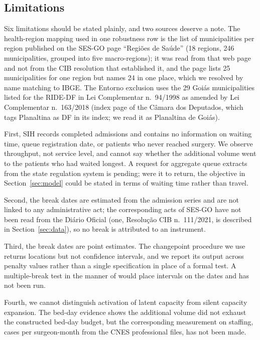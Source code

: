 \subsection{Limitations}
\label{sec:limits}

Six limitations should be stated plainly, and two sources deserve a note. The health-region mapping used in one robustness row is the list of municipalities per region published on the SES-GO page ``Regi\~oes de Sa\'ude'' (18 regions, 246 municipalities, grouped into five macro-regions); it was read from that web page and not from the CIB resolution that established it, and the page lists 25 municipalities for one region but names 24 in one place, which we resolved by name matching to IBGE. The Entorno exclusion uses the 29 Goi\'as municipalities listed for the RIDE-DF in Lei Complementar n.\ 94/1998 as amended by Lei Complementar n.\ 163/2018 (index page of the C\^amara dos Deputados, which tags Planaltina as DF in its index; we read it as Planaltina de Goi\'as).

First, SIH records completed admissions and contains no information on waiting
time, queue registration date, or patients who never reached surgery. We observe
throughput, not service level, and cannot say whether the additional volume went
to the patients who had waited longest. A request for aggregate queue extracts
from the state regulation system is pending; were it to return, the objective in
Section~\ref{sec:model} could be stated in terms of waiting time rather than
travel.

Second, the break dates are estimated from the admission series and are not linked to any administrative act; the corresponding acts of SES-GO have not been read from the Di\'ario Oficial (one, Resolu\c{c}\~ao CIB n.\ 111/2021, is described in Section~\ref{sec:data}), so no break is attributed to an instrument.

Third, the break dates are point estimates. The changepoint procedure we use
returns locations but not confidence intervals, and we report its output across
penalty values rather than a single specification in place of a formal test. A
multiple-break test in the manner of \citet{bai1998} would place intervals on
the dates and has not been run.

Fourth, we cannot distinguish activation of latent capacity from silent capacity
expansion. The bed-day evidence shows the additional volume did not exhaust the constructed bed-day budget, but the corresponding measurement on staffing,
cases per surgeon-month from the CNES professional files, has not been made.

